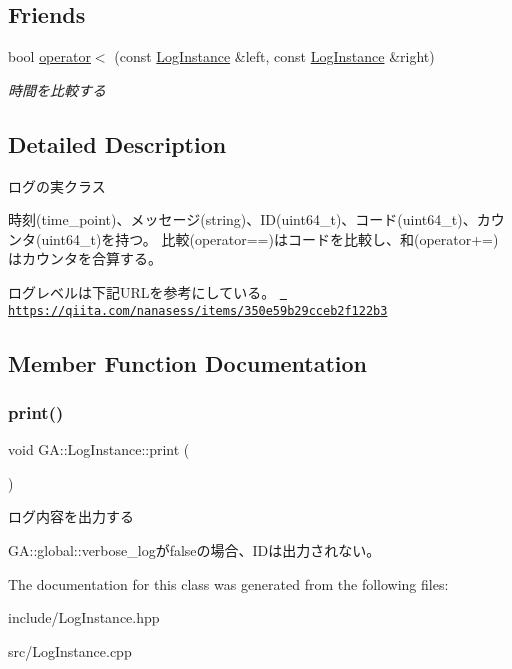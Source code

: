 \subsection*{Friends}
\begin{DoxyCompactItemize}
\item 
\mbox{\label{class_g_a_1_1_log_instance_a468d0ac2ca4d6114a5698ac9e117b377}} 
bool \mbox{\hyperlink{class_g_a_1_1_log_instance_a468d0ac2ca4d6114a5698ac9e117b377}{operator$<$}} (const \mbox{\hyperlink{class_g_a_1_1_log_instance}{Log\+Instance}} \&left, const \mbox{\hyperlink{class_g_a_1_1_log_instance}{Log\+Instance}} \&right)
\begin{DoxyCompactList}\small\item\em 時間を比較する \end{DoxyCompactList}\end{DoxyCompactItemize}


\subsection{Detailed Description}
ログの実クラス 

時刻(time\+\_\+point)、メッセージ(string)、\+I\+D(uint64\+\_\+t)、コード(uint64\+\_\+t)、カウンタ(uint64\+\_\+t)を持つ。 比較(operator==)はコードを比較し、和(operator+=)はカウンタを合算する。

ログレベルは下記\+U\+R\+Lを参考にしている。 \href{https://qiita.com/nanasess/items/350e59b29cceb2f122b3}{\texttt{ https\+://qiita.\+com/nanasess/items/350e59b29cceb2f122b3}} 

\subsection{Member Function Documentation}
\mbox{\label{class_g_a_1_1_log_instance_abee57f65eb6587f097172a2410a8eb37}} 
\subsubsection{\texorpdfstring{print()}{print()}}
{\footnotesize\ttfamily void G\+A\+::\+Log\+Instance\+::print (\begin{DoxyParamCaption}{ }\end{DoxyParamCaption})}



ログ内容を出力する 

G\+A\+::global\+::verbose\+\_\+logがfalseの場合、\+I\+Dは出力されない。 

The documentation for this class was generated from the following files\+:\begin{DoxyCompactItemize}
\item 
include/Log\+Instance.\+hpp\item 
src/Log\+Instance.\+cpp\end{DoxyCompactItemize}
